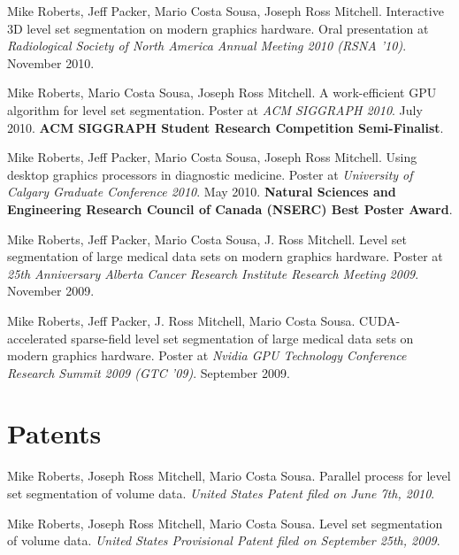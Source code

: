 \begin{noindent}Mike Roberts, Jeff Packer, Mario Costa Sousa, Joseph Ross Mitchell. Interactive 3D level set segmentation on modern graphics hardware. Oral presentation at \emph{Radiological Society of North America Annual Meeting 2010 (RSNA '10)}. November 2010.\end{noindent}

\bigskip

\begin{noindent}Mike Roberts, Mario Costa Sousa, Joseph Ross Mitchell. A work-efficient GPU algorithm for level set segmentation. Poster at \emph{ACM SIGGRAPH 2010}. July 2010. \textbf{ACM SIGGRAPH Student Research Competition Semi-Finalist}.\end{noindent}

\bigskip

\begin{noindent}Mike Roberts, Jeff Packer, Mario Costa Sousa, Joseph Ross Mitchell. Using desktop graphics processors in diagnostic medicine. Poster at \emph{University of Calgary Graduate Conference 2010}. May 2010. \textbf{Natural Sciences and Engineering Research Council of Canada (NSERC) Best Poster Award}.\end{noindent}

\bigskip

\begin{noindent}Mike Roberts, Jeff Packer, Mario Costa Sousa, J. Ross Mitchell. Level set segmentation of large medical data sets on modern graphics hardware. Poster at \emph{25th Anniversary Alberta Cancer Research Institute Research Meeting 2009}. November 2009.\end{noindent}

\bigskip

\begin{noindent}Mike Roberts, Jeff Packer, J. Ross Mitchell, Mario Costa Sousa. CUDA-accelerated sparse-field level set segmentation of large medical data sets on modern graphics hardware. Poster at \emph{Nvidia GPU Technology Conference Research Summit 2009 (GTC '09)}. September 2009.\end{noindent}

\section{Patents}

\begin{noindent}Mike Roberts, Joseph Ross Mitchell, Mario Costa Sousa. Parallel process for level set segmentation of volume data. \emph{United States Patent filed on June 7th, 2010}.\end{noindent}

\bigskip

\begin{noindent}Mike Roberts, Joseph Ross Mitchell, Mario Costa Sousa. Level set segmentation of volume data. \emph{United States Provisional Patent filed on September 25th, 2009}.\end{noindent}

